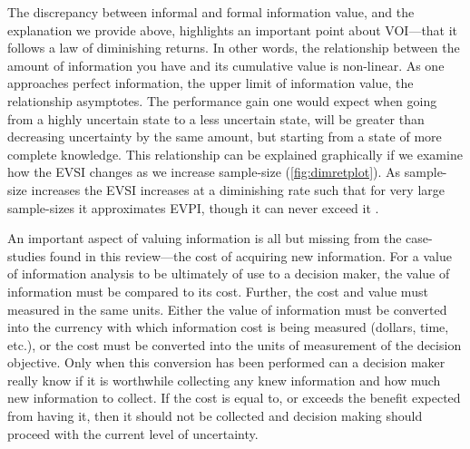 \documentclass[]{article}
\theoremstyle{definition}
\theoremstyle{definition}
\theoremstyle{definition}
\theoremstyle{remark}
\begin{document}
The discrepancy between informal and formal information value, and the
explanation we provide above, highlights an important point about
VOI---that it follows a law of diminishing returns. In other words, the
relationship between the amount of information you have and its
cumulative value is non-linear. As one approaches perfect information,
the upper limit of information value, the relationship asymptotes. The
performance gain one would expect when going from a highly uncertain
state to a less uncertain state, will be greater than decreasing
uncertainty by the same amount, but starting from a state of more
complete knowledge. This relationship can be explained graphically if we
examine how the EVSI changes as we increase sample-size
(\ref{fig:dimretplot}). As sample-size increases the EVSI increases at a
diminishing rate such that for very large sample-sizes it approximates
EVPI, though it can never exceed it \citep{Raiffa1961}.

An important aspect of valuing information is all but missing from the
case-studies found in this review---the cost of acquiring new
information. For a value of information analysis to be ultimately of use
to a decision maker, the value of information must be compared to its
cost. Further, the cost and value must measured in the same units.
Either the value of information must be converted into the currency with
which information cost is being measured (dollars, time, etc.), or the
cost must be converted into the units of measurement of the decision
objective. Only when this conversion has been performed can a decision
maker really know if it is worthwhile collecting any knew information
and how much new information to collect. If the cost is equal to, or
exceeds the benefit expected from having it, then it should not be
collected and decision making should proceed with the current level of
uncertainty.
\end{document}
